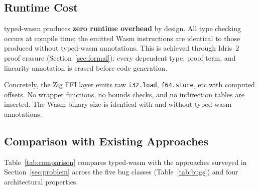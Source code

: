 \documentclass[sigplan,nonacm,screen]{acmart}
\begin{document}
\subsection{Runtime Cost}

typed-wasm produces \textbf{zero runtime overhead} by design.  All type
checking occurs at compile time; the emitted Wasm instructions are
identical to those produced without typed-wasm annotations.  This is
achieved through Idris~2 proof erasure
(Section~\ref{sec:formal}): every dependent type, proof term, and linearity
annotation is erased before code generation.

Concretely, the Zig FFI layer emits raw \texttt{i32.load}, \texttt{f64.store},
etc.\@ with computed offsets.  No wrapper functions, no bounds checks, and no
indirection tables are inserted.  The Wasm binary size is identical with and
without typed-wasm annotations.

\subsection{Comparison with Existing Approaches}

Table~\ref{tab:comparison} compares typed-wasm with the approaches
surveyed in Section~\ref{sec:problem} across the five bug classes
(Table~\ref{tab:bugs}) and four architectural properties.
\end{document}
